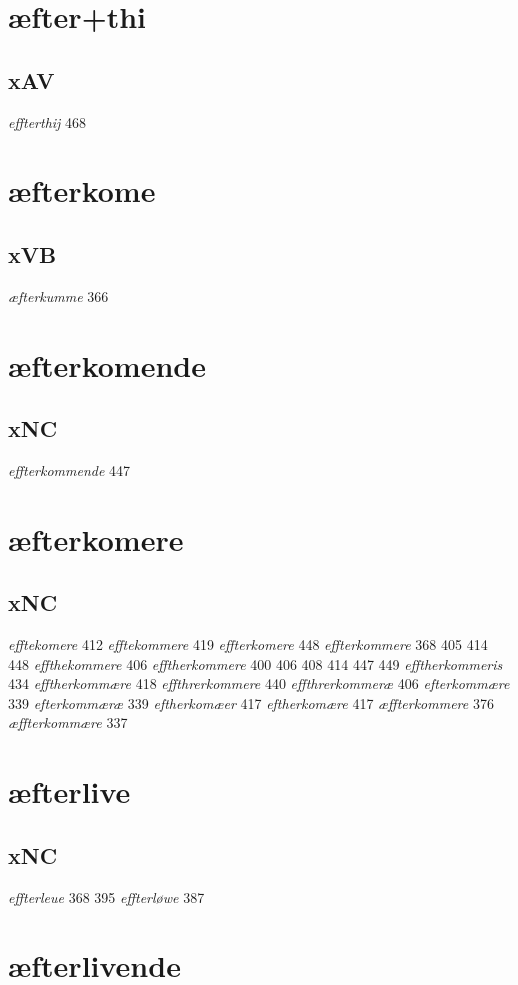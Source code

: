 \documentclass[a4paper,twocolumn]{article}
\begin{document}
\section{æfter+thi}
\label{sec:orgb83c195}
\subsection{xAV}
\label{sec:org734da0b}
\emph{effterthij} 468 
\section{æfterkome}
\label{sec:org3ffca9a}
\subsection{xVB}
\label{sec:orgabdab85}
\emph{æfterkumme} 366 
\section{æfterkomende}
\label{sec:org6410cd1}
\subsection{xNC}
\label{sec:orge352de7}
\emph{effterkommende} 447 
\section{æfterkomere}
\label{sec:orgae88daa}
\subsection{xNC}
\label{sec:org590a04a}
\emph{efftekomere} 412 \emph{efftekommere} 419 \emph{effterkomere} 448 \emph{effterkommere} 368 405 414 448 \emph{effthekommere} 406 \emph{efftherkommere} 400 406 408 414 447 449 \emph{efftherkommeris} 434 \emph{efftherkommære} 418 \emph{effthrerkommere} 440 \emph{effthrerkommeræ} 406 \emph{efterkommære} 339 \emph{efterkommæræ} 339 \emph{eftherkomæer} 417 \emph{eftherkomære} 417 \emph{æffterkommere} 376 \emph{æffterkommære} 337 
\section{æfterlive}
\label{sec:org12242de}
\subsection{xNC}
\label{sec:org029c179}
\emph{effterleue} 368 395 \emph{effterløwe} 387 
\section{æfterlivende}
\label{sec:org8225974}
\end{document}
